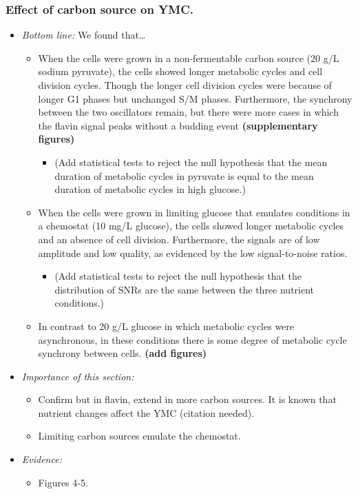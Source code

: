 \subsubsection{Effect of carbon source on YMC.}
\label{sec:orga36e0a0}
\begin{itemize}
\item \emph{Bottom line:} We found that\ldots{}
\begin{itemize}
\item When the cells were grown in a non-fermentable carbon source (20 g/L sodium pyruvate), the cells showed longer metabolic cycles and cell division cycles.  Though the longer cell division cycles were because of longer G1 phases but unchanged S/M phases.  Furthermore, the synchrony between the two oscillators remain, but there were more cases in which the flavin signal peaks without a budding event \textbf{(supplementary figures)}
\begin{itemize}
\item (Add statistical tests to reject the null hypothesis that the mean duration of metabolic cycles in pyruvate is equal to the mean duration of metabolic cycles in high glucose.)
\end{itemize}
\item When the cells were grown in limiting glucose that emulates conditions in a chemostat (10 mg/L glucose), the cells showed longer metabolic cycles and an absence of cell division.  Furthermore, the signals are of low amplitude and low quality, as evidenced by the low signal-to-noise ratios.
\begin{itemize}
\item (Add statistical tests to reject the null hypothesis that the distribution of SNRs are the same between the three nutrient conditions.)
\end{itemize}
\item In contrast to 20 g/L glucose in which metabolic cycles were asynchronous, in these conditions there is some degree of metabolic cycle synchrony between cells. \textbf{(add figures)}
\end{itemize}
\item \emph{Importance of this section:}
\begin{itemize}
\item Confirm \cite{papagiannakisAutonomousMetabolicOscillations2017} but in flavin, extend in more carbon sources.  It is known that nutrient changes affect the YMC (citation needed).
\item Limiting carbon sources emulate the chemostat.
\end{itemize}
\item \emph{Evidence:}
\begin{itemize}
\item Figures 4-5.
\end{itemize}


\end{itemize}
